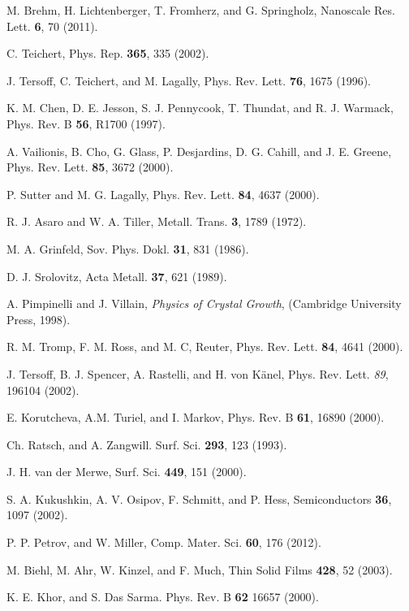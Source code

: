 \documentclass[aps,prl,showpacs,twocolumn,byrevtex,floatfix]{revtex4-1}
\begin{document}
\begin{thebibliography}{99}
M. Brehm, H. Lichtenberger, T. Fromherz, and G. Springholz, Nanoscale Res.
Lett. {\bf 6}, 70 (2011).

C. Teichert, Phys. Rep. {\bf 365}, 335 (2002).

J. Tersoff, C. Teichert, and M. Lagally, Phys. Rev. Lett. {\bf 76}, 1675 (1996).

K. M. Chen, D. E. Jesson, S. J. Pennycook, T. Thundat, and R. J. Warmack, Phys.
Rev. B {\bf 56}, R1700 (1997).

A. Vailionis, B. Cho, G. Glass, P. Desjardins, D. G. Cahill, and J. E. Greene,
Phys. Rev. Lett. {\bf 85}, 3672 (2000).

P. Sutter and M. G. Lagally, Phys. Rev. Lett. {\bf 84}, 4637 (2000).

R. J. Asaro and W. A. Tiller, Metall. Trans. {\bf 3}, 1789 (1972).

M. A. Grinfeld, Sov. Phys. Dokl. {\bf 31}, 831 (1986).

D. J. Srolovitz, Acta Metall. {\bf 37}, 621 (1989).

A. Pimpinelli and J. Villain, {\it Physics of Crystal Growth}, (Cambridge
University Press, 1998).

R. M. Tromp, F. M. Ross, and M. C, Reuter, Phys. Rev. Lett. {\bf 84}, 4641
(2000).

J. Tersoff, B. J. Spencer, A. Rastelli, and H. von K\"anel, Phys. Rev. Lett.
{\it 89}, 196104 (2002).

E. Korutcheva, A.M. Turiel, and I. Markov, Phys. Rev. B {\bf 61}, 16890 (2000).


Ch. Ratsch, and A. Zangwill. Surf. Sci. {\bf 293}, 123 (1993).

J. H. van der Merwe, Surf. Sci. {\bf 449}, 151 (2000).

S. A. Kukushkin, A. V. Osipov, F. Schmitt, and P. Hess, Semiconductors {\bf 36},
1097 (2002).

P. P. Petrov, and W. Miller, Comp. Mater. Sci. {\bf 60}, 176 (2012).

M. Biehl, M. Ahr, W. Kinzel, and F. Much, Thin Solid Films {\bf 428}, 52
(2003).

K. E. Khor, and S. Das Sarma. Phys. Rev. B {\bf 62} 16657 (2000).


\end{thebibliography}
\end{document}
